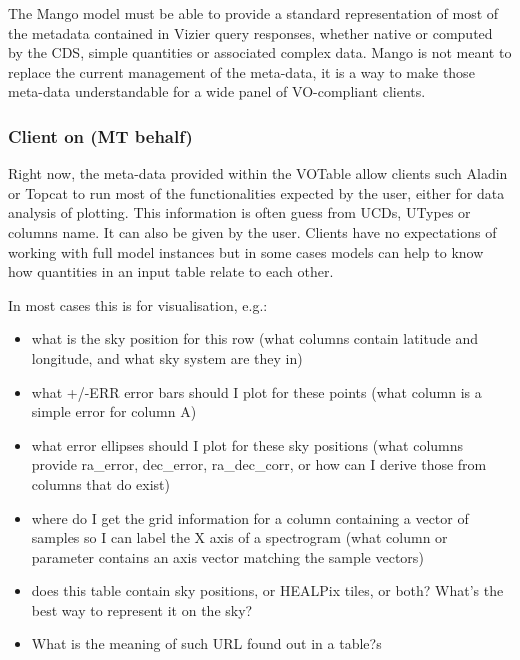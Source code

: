 \documentclass[11pt,a4paper]{ivoa}
\begin{document}
\begin{itemize}
The Mango model must be able to provide a standard representation of most of the metadata contained in Vizier query responses, whether native or computed  by the CDS, simple quantities or associated complex data.
Mango is not meant to replace the current management of the meta-data, it is a way to make those meta-data understandable for a wide panel of VO-compliant clients.

\subsubsection{Client on (MT behalf)}
Right now, the meta-data provided within the VOTable allow clients such Aladin or Topcat to run most 
of the functionalities expected by the user, either for data analysis of plotting.
This information is often guess from UCDs, UTypes or columns name. It can also be given by the user.
Clients have no expectations of working with full model instances but in some cases models 
can help to know how quantities in an input table relate to each other.

In most cases this is for visualisation, e.g.:
\begin{itemize}
    \item what is the sky position for this row
    (what columns contain latitude and longitude, and what sky system are they in)

     \item what +/-ERR error bars should I plot for these points
    (what column is a simple error for column A)

    \item what error ellipses should I plot for these sky positions
    (what columns provide ra\_error, dec\_error, ra\_dec\_corr,
     or how can I derive those from columns that do exist)

    \item where do I get the grid information for a column containing
    a vector of samples so I can label the X axis of a spectrogram
    (what column or parameter contains an axis vector matching
     the sample vectors)

    \item does this table contain sky positions, or HEALPix tiles, or both?
    What's the best way to represent it on the sky?

    \item What is the meaning of such URL found out in a table?s
\end{itemize}


\end{itemize}
\end{document}
